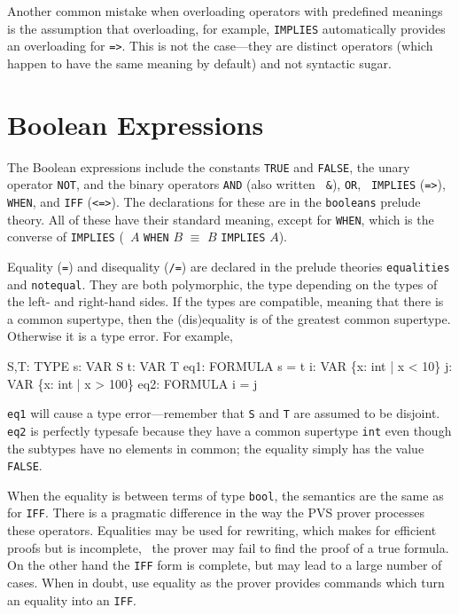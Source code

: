 Another common mistake when overloading operators with predefined meanings
is the assumption that overloading, for example, {\tt IMPLIES} automatically
provides an overloading for {\tt =>}.  This is not the case---they are distinct
operators (which happen to have the same meaning by default) and not syntactic
sugar.


\section{Boolean Expressions}\label{bool-exprs}

The Boolean expressions include the constants \texttt{TRUE} and
\texttt{FALSE},
the unary operator \texttt{NOT}, and
the binary operators \texttt{AND} (also written
\texttt{ \&}\index{\&}), \texttt{OR}, \texttt{
IMPLIES}
(\texttt{=>}),
\texttt{WHEN}, and
\texttt{IFF}
(\texttt{<=>}).  The declarations for these are in
the \texttt{booleans} prelude theory.  All of these have their standard
meaning, except for \texttt{WHEN}, which is the converse of
\texttt{IMPLIES} (\ie\ $A$ \texttt{WHEN} $B$ $\equiv$ $B$ \texttt{IMPLIES}
$A$).

Equality (\texttt{=}\index{=}) and
disequality (\texttt{/=}\index{/=}) are declared in the
prelude theories \texttt{equalities} and \texttt{notequal}.  They are both
polymorphic, the type depending on the types of the left- and right-hand
sides.  If the types are compatible, meaning that there is a common
supertype, then the (dis)equality is of the greatest common supertype.  Otherwise it is a type
error.  For example,
\begin{pvsex}
  S,T: TYPE
  s: VAR S
  t: VAR T
  eq1: FORMULA s = t
  i: VAR \{x: int | x < 10\}
  j: VAR \{x: int | x > 100\}
  eq2: FORMULA i = j
\end{pvsex}
%
\texttt{eq1} will cause a type error---remember that \texttt{S} and \texttt{T}
are assumed to be disjoint.  \texttt{eq2} is perfectly typesafe because
they have a common supertype \texttt{int} even though the subtypes have no
elements in common; the equality simply has the value \texttt{FALSE}.

When the equality is between terms of type \texttt{bool}, the semantics
are the same as for \texttt{IFF}.  There is a pragmatic difference in the
way the PVS prover processes these operators.  Equalities may be
used for rewriting, which makes for efficient proofs but is incomplete,
\ie\ the prover may fail to find the proof of a true formula.  On the other
hand the \texttt{IFF} form is complete, but may lead to a large number of
cases.  When in doubt, use equality as the prover provides commands
which turn an equality into an \texttt{IFF}.

